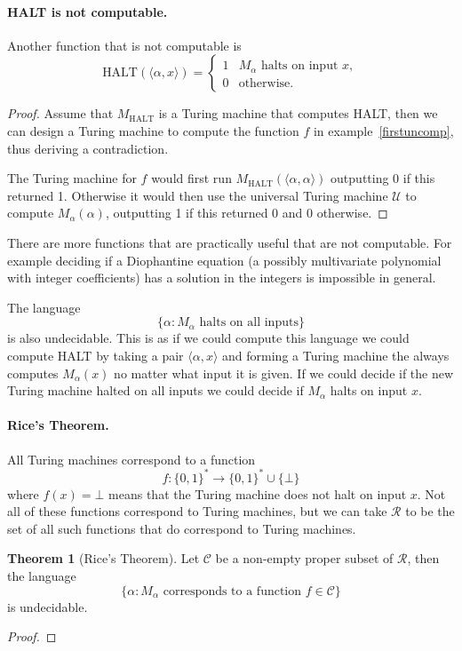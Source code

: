 \documentclass[11pt,a4paper]{article}
\theoremstyle{definition}
\newtheorem{thm}{Theorem}
\newcommand{\U}{\mathcal{U}}
\begin{document}
\paragraph{HALT is not computable.}
Another function that is not computable is
\[
\text{HALT}(\langle \alpha,x\rangle) =\begin{cases}
1 & M_\alpha \text{ halts on input }x,\\
0 &\text{otherwise}.
\end{cases}
\]
\begin{proof}
Assume that $M_{\text{HALT}}$ is a Turing machine that computes HALT, then we can design a Turing machine to compute the function $f$ in example~\ref{firstuncomp}, thus deriving a contradiction.

The Turing machine for $f$ would first run $M_{\text{HALT}}(\langle \alpha,\alpha\rangle)$ outputting 0 if this returned 1.
Otherwise it would then use the universal Turing machine $\U$ to compute $M_\alpha (\alpha)$, outputting 1 if this returned 0 and 0 otherwise.
\end{proof}

There are more functions that are practically useful that are not computable.
For example deciding if a Diophantine equation (a possibly multivariate polynomial with integer coefficients) has a solution in the integers is impossible in general.

The language
\[
\{\alpha : M_{\alpha} \text{ halts on all inputs}\}
\]
is also undecidable.
This is as if we could compute this language we could compute HALT by taking a pair $\langle \alpha,x\rangle$ and forming a Turing machine the always computes $M_\alpha(x)$ no matter what input it is given.
If we could decide if the new Turing machine halted on all inputs we could decide if $M_\alpha$ halts on input $x$.

\paragraph{Rice's Theorem.}
All Turing machines correspond to a function
\[
f\colon\{0,1\}^*\to\{0,1\}^*\cup\{\bot\}
\]
where $f(x) = \bot$ means that the Turing machine does not halt on input $x$.
Not all of these functions correspond to Turing machines, but we can take $\mathcal{R}$ to be the set of all such functions that do correspond to Turing machines.

\begin{thm}[Rice's Theorem]
Let $\mathcal{C}$ be a non-empty proper subset of $\mathcal{R}$, then the language
\[
\{\alpha : M_\alpha \text{ corresponds to a function } f\in \mathcal{C}\}
\]
is undecidable.
\end{thm}
\begin{proof}
\end{proof}
\end{document}
